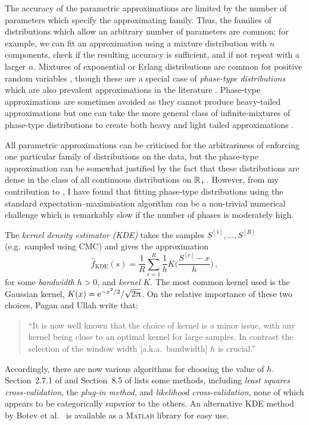 The accuracy of the parametric approximations are limited by the number of parameters which specify the approximating family. Thus, the families of distributions which allow an arbitrary number of parameters are common; for example, we can fit an approximation using a mixture distribution with $n$ components, check if the resulting accuracy is sufficient, and if not repeat with a larger $n$. Mixtures of exponential or Erlang distributions are common for positive random variables \cite{WiWo07,LeLi10,WiLi11}, though these are a special case of \emph{phase-type distributions} which are also prevalent approximations in the literature \cite{bladt2005review,hassan2009actuarial,hassan2014use,APQ,asmussen2010ruin}. Phase-type approximations are sometimes avoided as they cannot produce heavy-tailed approximations \cite{embrechts2009panjer} but one can take the more general class of infinite-mixtures of phase-type distributions to create both heavy and light tailed approximations \cite{rojas2017asymptotic,yao2016estimating}.

All parametric approximations can be criticised for the arbitrariness of enforcing one particular family of distributions on the data, but the phase-type approximation can be somewhat justified by the fact that these distributions are dense in the class of all continuous distributions on $\mathbb{R}_+$. However, from my contribution to \cite{asmussen2018phase}, I have found that fitting phase-type distributions using the standard expectation--maximisation algorithm \cite{asmussen1996fitting,olsson1996estimation} can be a non-trivial numerical challenge which is remarkably slow if the number of phases is moderately high.

The \emph{kernel density estimator (KDE)} \cite{wand1994kernel} takes the samples $S^{[1]}, \dots, S^{[R]}$ (e.g.\ sampled using CMC) and gives the approximation
\[ \hat{f}_{\mathrm{KDE}}(s) = \frac{1}{R} \sum_{r=1}^{R} \frac{1}{h} K\bigl(\frac{S^{[r]} - x}{h}\bigr) \,, \]
for some \emph{bandwidth} $h > 0$, and \emph{kernel} $K$. The most common kernel used is the Gaussian kernel, $K(x) = \mathrm{e}^{-x^2/2}/\sqrt{2\uppi}$. On the relative importance of these two choices, Pagan and Ullah \cite[p.\ 19]{pagan1999nonparametric} write that:
\begin{quote}
	``It is now well known that the choice of kernel is a minor issue, with any kernel being close to an optimal kernel for large samples. In contrast the selection of the window width [a.k.a.\ bandwidth] $h$ is crucial.''
\end{quote}
Accordingly, there are now various algorithms for choosing the value of $h$. Section~2.7.1 of \cite{pagan1999nonparametric} and Section~8.5 of \cite{kroese2013handbook} lists some methods, including \emph{least squares cross-validation}, the \emph{plug-in method}, and \emph{likelihood cross-validation}, none of which appears to be categorically superior to the others. An alternative KDE method by Botev et al.\ \cite{botev2010kernel} is available as a \textsc{Matlab} library for easy use.


